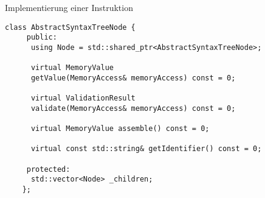
\begin{frame}[fragile]{Implementierung einer Instruktion}
  \pause
  \begin{lstlisting}[style=C++]
    class AbstractSyntaxTreeNode {
     public:
      using Node = std::shared_ptr<AbstractSyntaxTreeNode>;

      virtual MemoryValue
      getValue(MemoryAccess& memoryAccess) const = 0;

      virtual ValidationResult
      validate(MemoryAccess& memoryAccess) const = 0;

      virtual MemoryValue assemble() const = 0;

      virtual const std::string& getIdentifier() const = 0;

     protected:
      std::vector<Node> _children;
    };
  \end{lstlisting}
\end{frame}


